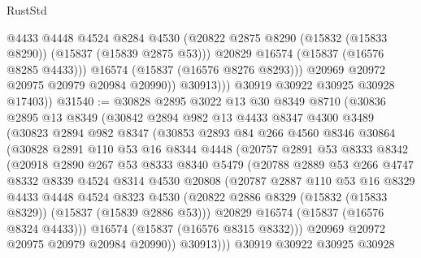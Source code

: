 \begin{lexlean}{RustStd}
\begin{coremodule}
                      @4433
                      @4448
                      @4524
                      @8284
                      @4530
                      (@20822 @2875 @8290 (@15832 (@15833 @8290)) (@15837 (@15839 @2875 @53)))
                      @20829
                      @16574
                      (@15837 (@16576 @8285 @4433)))
                    @16574
                    (@15837 (@16576 @8276 @8293)))
                  @20969
                  @20972
                  @20975
                  @20979
                  @20984
                  @20990))
              @30913)))
        @30919
        @30922
        @30925
        @30928
        @17403))
@31540 := @30828
    @2895
    @3022
    @13
    @30
    @8349
    @8710
    (@30836
      @2895
      @13
      @8349
      (@30842
        @2894
        @982
        @13
        @4433
        @8347
        @4300
        @3489
        (@30823
          @2894
          @982
          @8347
          (@30853
            @2893
            @84
            @266
            @4560
            @8346
            @30864
            (@30828
              @2891
              @110
              @53
              @16
              @8344
              @4448
              (@20757
                @2891
                @53
                @8333
                @8342
                (@20918
                  @2890
                  @267
                  @53
                  @8333
                  @8340
                  @5479
                  (@20788
                    @2889
                    @53
                    @266
                    @4747
                    @8332
                    @8339
                    @4524
                    @8314
                    @4530
                    @20808
                    (@20787
                      @2887
                      @110
                      @53
                      @16
                      @8329
                      @4433
                      @4448
                      @4524
                      @8323
                      @4530
                      (@20822 @2886 @8329 (@15832 (@15833 @8329)) (@15837 (@15839 @2886 @53)))
                      @20829
                      @16574
                      (@15837 (@16576 @8324 @4433)))
                    @16574
                    (@15837 (@16576 @8315 @8332)))
                  @20969
                  @20972
                  @20975
                  @20979
                  @20984
                  @20990))
              @30913)))
        @30919
        @30922
        @30925
        @30928

\end{coremodule}
\end{lexlean}
